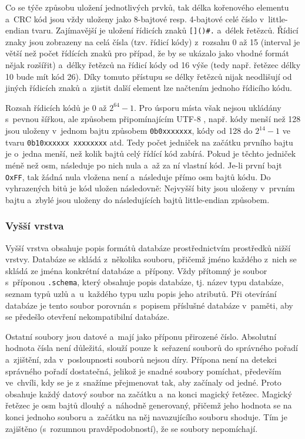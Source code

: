 Co se týče způsobu uložení jednotlivých prvků, tak délka kořenového elementu a~CRC kód
jsou vždy uloženy jako 8-bajtové resp. 4-bajtové celé číslo v~little-endian tvaru.
Zajímavější je uložení řídicích znaků \verb|[]()#.| a~délek řetězců. Řídicí znaky
jsou zobrazeny na celá čísla (tzv. řídicí kódy) z~rozsahu 0 až 15 (interval je větší
než počet řídících
znaků pro případ, že by se ukázalo jako vhodné formát nějak rozšířit) a~délky řetězců
na řídicí kódy od 16 výše (tedy např. řetězec délky 10 bude mít kód 26). Díky tomuto 
přístupu se délky řetězců nijak neodlišují od jiných řídicích znaků a~zjistit další
element lze načtením jednoho řídicího kódu. 

Rozsah řídicích kódů je 0 až $2^{64} - 1$.
Pro úsporu místa však nejsou ukládány s~pevnou šířkou, ale způsobem připomínajícím
UTF-8 \cite{utf8}, např. kódy menší než 128 jsou uloženy v~jednom bajtu způsobem
\verb|0b0xxxxxxx|, kódy od 128 do $2^{14} - 1$ ve tvaru \verb|0b10xxxxxx xxxxxxxx| atd.
Tedy počet jedniček na začátku prvního bajtu je o~jedna menší, než kolik bajtů celý
řídící kód zabírá. Pokud je těchto jedniček méně než osm, následuje po nich nula
a~až za ní vlastní kód. Je-li první bajt \verb|OxFF|, tak žádná nula vložena není
a~následuje přímo osm bajtů kódu. Do vyhrazených bitů je kód uložen následovně:
Nejvyšší bity jsou uloženy v~prvním bajtu a~zbylé jsou uloženy do následujících bajtů
little-endian způsobem.

\subsubsection*{Vyšší vrstva}
Vyšší vrstva obsahuje popis formátů databáze prostřednictvím prostředků nižší vrstvy.
Databáze se skládá z~několika souboru, přičemž jméno každého z~nich se skládá ze
jména konkrétní databáze a~přípony. Vždy přítomný je soubor s~příponou \verb|.schema|,
který obsahuje popis databáze, tj. název typu databáze, seznam typů uzlů a~u~každého
typu uzlu popis jeho atributů. Při otevírání databáze je tento soubor porovnán
s~popisem příslušné databáze v~paměti, aby se předešlo otevření nekompatibilní databáze.

Ostatní soubory jsou datové a~mají jako příponu přirozené číslo. Absolutní hodnota
čísla není důležitá, slouží pouze k~seřazení souborů do správného pořadí a~zjištění,
zda v~posloupnosti souborů nejsou díry. Přípona není na detekci správného
pořadí dostatečná, jelikož je snadné soubory pomíchat, především ve~chvíli, kdy se
je z~snažíme přejmenovat tak, aby začínaly od jedné. Proto obsahuje každý datový soubor
na začátku a~na konci magický řetězec. Magický řetězec je osm bajtů dlouhý a~náhodně
generovaný, přičemž jeho hodnota se na konci jednoho souboru a~začátku na něj
navazujícího souboru shoduje. Tím je zajištěno (s~rozumnou pravděpodobností), že se
soubory nepomíchají.

